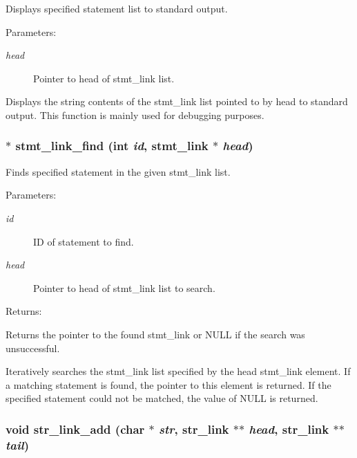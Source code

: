 Displays specified statement list to standard output.

\begin{Desc}
\item[Parameters: ]\par
\begin{description}
\item[{\em 
head}]Pointer to head of stmt\_\-link list.\end{description}
\end{Desc}
Displays the string contents of the stmt\_\-link list pointed to by head to standard output. This function is mainly used for debugging purposes. 
\subsubsection{$\ast$ stmt\_\-link\_\-find (int {\em id}, {\bf stmt\_\-link} $\ast$ {\em head})}\label{link_8c_a12}


Finds specified statement in the given stmt\_\-link list.

\begin{Desc}
\item[Parameters: ]\par
\begin{description}
\item[{\em 
id}]ID of statement to find. \item[{\em 
head}]Pointer to head of stmt\_\-link list to search.\end{description}
\end{Desc}
\begin{Desc}
\item[Returns: ]\par
Returns the pointer to the found stmt\_\-link or NULL if the search was unsuccessful.\end{Desc}
Iteratively searches the stmt\_\-link list specified by the head stmt\_\-link element. If a matching statement is found, the pointer to this element is returned. If the specified statement could not be matched, the value of NULL is returned. 
\subsubsection{\setlength{\rightskip}{0pt plus 5cm}void str\_\-link\_\-add (char $\ast$ {\em str}, {\bf str\_\-link} $\ast$$\ast$ {\em head}, {\bf str\_\-link} $\ast$$\ast$ {\em tail})}\label{link_8c_a0}


